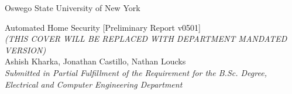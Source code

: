 \documentclass[a4paper,11pt]{report}
\title{}
\date{February 15, 2020}
\author{Nathan Louck}
\begin{document}
	\begin{titlepage}
		\begin{center}
			\large
			Oswego State University of New York \\ 
			\vspace{2.5in}
		
			Automated Home Security [Preliminary Report v0501] \\ 
			\tiny\textit{(THIS COVER WILL BE REPLACED WITH DEPARTMENT MANDATED VERSION)}\\
			\vspace{2in}
			\normalsize 
			Ashish Kharka, Jonathan Castillo, Nathan Loucks \\
			\vspace{0.5in}
			\small\textit{
				Submitted in Partial Fulfillment of the Requirement for the B.Sc. Degree, 	\\Electrical and Computer Engineering Department
			}
		\end{center}
	\end{titlepage}
	\newpage
\end{document}
